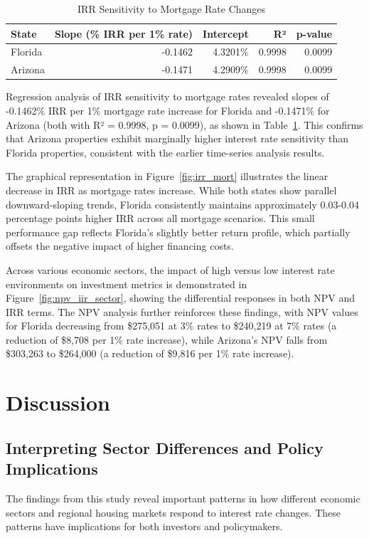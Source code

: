 \documentclass[12pt, stu, abstract]{apa7}
\begin{document}
\begin{table}[htbp]
\centering
\caption{IRR Sensitivity to Mortgage Rate Changes}
\label{tab:irr_slopes}
\begin{tabular}{lrrrr}
\toprule
State & Slope (\% IRR per 1\% rate) & Intercept & R² & p-value \\
\midrule
Florida & -0.1462 & 4.3201\% & 0.9998 & 0.0099 \\
Arizona & -0.1471 & 4.2909\% & 0.9998 & 0.0099 \\
\bottomrule
\end{tabular}
\end{table}

Regression analysis of IRR sensitivity to mortgage rates revealed slopes of -0.1462\% IRR per 1\% mortgage rate increase for Florida and -0.1471\% for Arizona (both with R² = 0.9998, p = 0.0099), as shown in Table~\ref{tab:irr_slopes}. This confirms that Arizona properties exhibit marginally higher interest rate sensitivity than Florida properties, consistent with the earlier time-series analysis results.

The graphical representation in Figure~\ref{fig:irr_mort} illustrates the linear decrease in IRR as mortgage rates increase. While both states show parallel downward-sloping trends, Florida consistently maintains approximately 0.03-0.04 percentage points higher IRR across all mortgage scenarios. This small performance gap reflects Florida's slightly better return profile, which partially offsets the negative impact of higher financing costs.

Across various economic sectors, the impact of high versus low interest rate environments on investment metrics is demonstrated in Figure~\ref{fig:npv_iir_sector}, showing the differential responses in both NPV and IRR terms. The NPV analysis further reinforces these findings, with NPV values for Florida decreasing from \$275,051 at 3\% rates to \$240,219 at 7\% rates (a reduction of \$8,708 per 1\% rate increase), while Arizona's NPV falls from \$303,263 to \$264,000 (a reduction of \$9,816 per 1\% rate increase).

\section{Discussion}
\subsection{Interpreting Sector Differences and Policy Implications}
The findings from this study reveal important patterns in how different economic sectors and regional housing markets respond to interest rate changes. These patterns have implications for both investors and policymakers.
\end{document}
